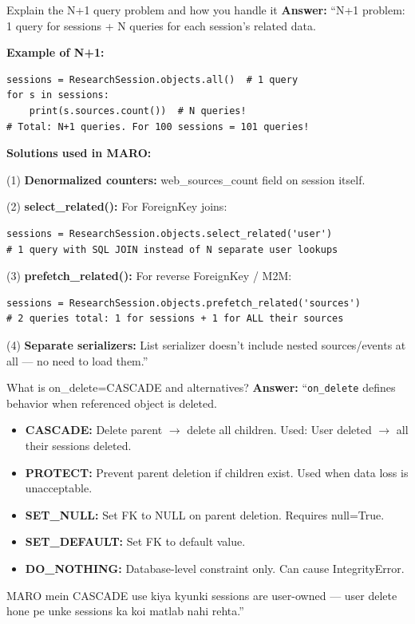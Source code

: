 \documentclass[11pt,a4paper,twoside]{report}
\begin{document}
\begin{interviewbox}{Explain the N+1 query problem and how you handle it}
\textbf{Answer:} ``N+1 problem: 1 query for sessions + N queries for each session's related data.

\textbf{Example of N+1:}
\begin{lstlisting}[style=pythonstyle]
sessions = ResearchSession.objects.all()  # 1 query
for s in sessions:
    print(s.sources.count())  # N queries!
# Total: N+1 queries. For 100 sessions = 101 queries!
\end{lstlisting}

\textbf{Solutions used in MARO:}

(1) \textbf{Denormalized counters:} web\_sources\_count field on session itself.

(2) \textbf{select\_related():} For ForeignKey joins:
\begin{lstlisting}[style=pythonstyle]
sessions = ResearchSession.objects.select_related('user')
# 1 query with SQL JOIN instead of N separate user lookups
\end{lstlisting}

(3) \textbf{prefetch\_related():} For reverse ForeignKey / M2M:
\begin{lstlisting}[style=pythonstyle]
sessions = ResearchSession.objects.prefetch_related('sources')
# 2 queries total: 1 for sessions + 1 for ALL their sources
\end{lstlisting}

(4) \textbf{Separate serializers:} List serializer doesn't include nested sources/events at all --- no need to load them.''
\end{interviewbox}

\begin{interviewbox}{What is on\_delete=CASCADE and alternatives?}
\textbf{Answer:} ``\texttt{on\_delete} defines behavior when referenced object is deleted.
\begin{itemize}
    \item \textbf{CASCADE:} Delete parent $\rightarrow$ delete all children. Used: User deleted $\rightarrow$ all their sessions deleted.
    \item \textbf{PROTECT:} Prevent parent deletion if children exist. Used when data loss is unacceptable.
    \item \textbf{SET\_NULL:} Set FK to NULL on parent deletion. Requires null=True.
    \item \textbf{SET\_DEFAULT:} Set FK to default value.
    \item \textbf{DO\_NOTHING:} Database-level constraint only. Can cause IntegrityError.
\end{itemize}
MARO mein CASCADE use kiya kyunki sessions are user-owned --- user delete hone pe unke sessions ka koi matlab nahi rehta.''
\end{interviewbox}
\end{document}
